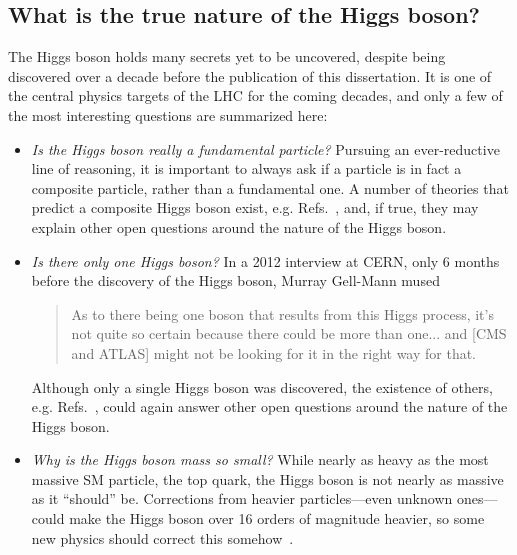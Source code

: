 \subsection{What is the true nature of the Higgs boson?}
The Higgs boson holds many secrets yet to be uncovered, despite being discovered over a decade before the publication of this dissertation. 
It is one of the central physics targets of the LHC for the coming decades, and only a few of the most interesting questions are summarized here:
\begin{itemize}
    \item{
        \textit{Is the Higgs boson really a fundamental particle?}
        Pursuing an ever-reductive line of reasoning, it is important to always ask if a particle is in fact a composite particle, rather than a fundamental one. 
        A number of theories that predict a composite Higgs boson exist, e.g. Refs.~\cite{Kaplan:1983sm, Arkani-Hamed:2002ikv, Contino:2003ve}, and, if true, they may explain other open questions around the nature of the Higgs boson.
    }
    \item{
        \textit{Is there only one Higgs boson?}
        In a 2012 interview at CERN, only 6 months before the discovery of the Higgs boson, Murray Gell-Mann mused
        \begin{quote}
            As to there being one boson that results from this Higgs process, it's not quite so certain because there could be more than one... 
            and [CMS and ATLAS] might not be looking for it in the right way for that.
        \end{quote}
        Although only a single Higgs boson was discovered, the existence of others, e.g. Refs.~\cite{Branco:2011iw, Gunion:2005ja, Grzadkowski:2009bt}, could again answer other open questions around the nature of the Higgs boson.
    }
    \item{
        \textit{Why is the Higgs boson mass so small?}
        While nearly as heavy as the most massive SM particle, the top quark, the Higgs boson is not nearly as massive as it ``should'' be. 
        Corrections from heavier particles---even unknown ones---could make the Higgs boson over 16 orders of magnitude heavier, so some new physics should correct this somehow~\cite{Susskind:1978ms, tHooft:1979rat}.
    }
\end{itemize}
